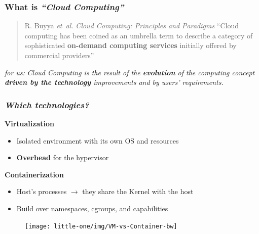 \begin{frame}
  \frametitle{ What is \textit{``Cloud Computing''}}

  \begin{quote}{R. Buyya \emph{et~al.} \textit{Cloud Computing: Principles and Paradigms}}
    ``Cloud computing has been coined as an umbrella term to describe a category of
    sophisticated \alert{\textbf{on-demand computing services}} initially offered by commercial providers''
  \end{quote}

  \pause

  \begin{block}{ \textit{for us:}}
    \textit{
      Cloud Computing is the result of the \alert{\textbf{evolution}} of the computing concept
      \alert{\textbf{driven by the technology}} improvements and by users’ requirements.
    }
  \end{block}
\end{frame}

\begin{frame}
  \frametitle{ \textit{Which
      technologies?}}

   \textbf{Virtualization}
  \begin{itemize}
    \itemsep0em
    \item Isolated environment with its own OS and resources
    \item \textbf{\alert{Overhead}} for the \alert{hypervisor}
  \end{itemize}

  \pause

   \textbf{Containerization}
  \begin{itemize}
    \itemsep0em
    \item Host's \alert{processes} $\to$ they share the Kernel with the host
    \item Build over \alert{namespaces}, \alert{cgroups}, and \alert{capabilities}
  \end{itemize}

  \pause

   \begin{figure}
    \centering
    \texttt{[image: little-one/img/VM-vs-Container-bw]}
  \end{figure}
\end{frame}

